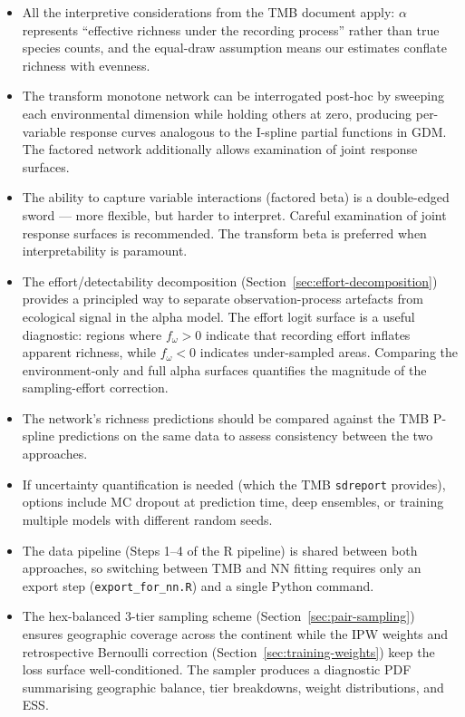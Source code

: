 \documentclass{article}
\begin{document}
\begin{itemize}
    \item All the interpretive considerations from the TMB document apply: $\alpha$ represents ``effective richness under the recording process'' rather than true species counts, and the equal-draw assumption means our estimates conflate richness with evenness.
    \item The transform monotone network can be interrogated post-hoc by sweeping each environmental dimension while holding others at zero, producing per-variable response curves analogous to the I-spline partial functions in GDM. The factored network additionally allows examination of joint response surfaces.
    \item The ability to capture variable interactions (factored beta) is a double-edged sword --- more flexible, but harder to interpret. Careful examination of joint response surfaces is recommended. The transform beta is preferred when interpretability is paramount.
    \item The effort/detectability decomposition (Section~\ref{sec:effort-decomposition}) provides a principled way to separate observation-process artefacts from ecological signal in the alpha model. The effort logit surface is a useful diagnostic: regions where $f_\omega > 0$ indicate that recording effort inflates apparent richness, while $f_\omega < 0$ indicates under-sampled areas. Comparing the environment-only and full alpha surfaces quantifies the magnitude of the sampling-effort correction.
    \item The network's richness predictions should be compared against the TMB P-spline predictions on the same data to assess consistency between the two approaches.
    \item If uncertainty quantification is needed (which the TMB \texttt{sdreport} provides), options include MC dropout at prediction time, deep ensembles, or training multiple models with different random seeds.
    \item The data pipeline (Steps 1--4 of the R pipeline) is shared between both approaches, so switching between TMB and NN fitting requires only an export step (\texttt{export\_for\_nn.R}) and a single Python command.
    \item The hex-balanced 3-tier sampling scheme (Section~\ref{sec:pair-sampling}) ensures geographic coverage across the continent while the IPW weights and retrospective Bernoulli correction (Section~\ref{sec:training-weights}) keep the loss surface well-conditioned. The sampler produces a diagnostic PDF summarising geographic balance, tier breakdowns, weight distributions, and ESS.

\end{itemize}
\end{document}
